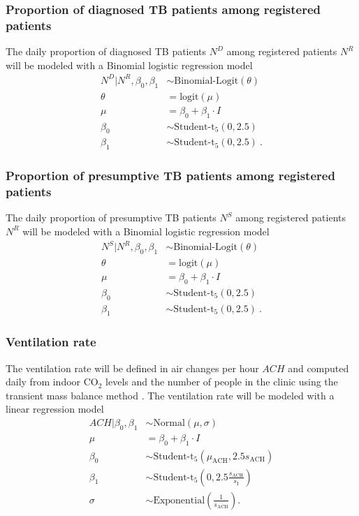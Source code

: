 \documentclass{article}
\begin{document}
\subsubsection{Proportion of diagnosed TB patients among registered patients}

The daily proportion of diagnosed TB patients $N^D$ among registered patients $N^R$ will be modeled with a Binomial logistic regression model
\begin{align*}
    N^D | N^R, \beta_0, \beta_1 &\sim \text{Binomial-Logit}(\theta) \\
    \theta &= \text{logit}(\mu) \\
    \mu &= \beta_0 + \beta_1 \cdot I \\
    \beta_0 &\sim \text{Student-t}_5(0, 2.5) \\
    \beta_1 &\sim \text{Student-t}_5\left(0, 2.5\right)~.
\end{align*}

\subsubsection{Proportion of presumptive TB patients among registered patients}

The daily proportion of presumptive TB patients $N^S$ among registered patients $N^R$ will be modeled with a Binomial logistic regression model
\begin{align*}
    N^S | N^R, \beta_0, \beta_1 &\sim \text{Binomial-Logit}(\theta) \\
    \theta &= \text{logit}(\mu) \\
    \mu &= \beta_0 + \beta_1 \cdot I \\
    \beta_0 &\sim \text{Student-t}_5(0, 2.5) \\
    \beta_1 &\sim \text{Student-t}_5\left(0, 2.5\right)~.
\end{align*}

\subsubsection{Ventilation rate}

The ventilation rate will be defined in air changes per hour $ACH$ and computed daily from indoor CO$_2$ levels and the number of people in the clinic using the transient mass balance method \cite{Batterman2017IJERPH}. The ventilation rate will be modeled with a linear regression model
\begin{align*}
    ACH | \beta_0, \beta_1 &\sim \text{Normal}(\mu, \sigma) \\
    \mu &= \beta_0 + \beta_1 \cdot I \\
    \beta_0 &\sim \text{Student-t}_5(\mu_{\text{ACH}}, 2.5s_{\text{ACH}}) \\
    \beta_1 &\sim \text{Student-t}_5\left(0, 2.5\frac{s_{\text{ACH}}}{s_{\text{I}}}\right) \\
    \sigma &\sim \text{Exponential}\left(\frac{1}{s_{\text{ACH}}}\right).
\end{align*}
\end{document}
